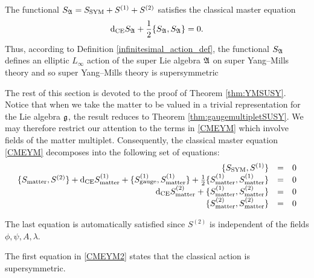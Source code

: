 \documentclass[10pt, oneside]{article}
\begin{document}
\begin{theorem}
The functional $S_{\mathfrak A} = S_{\rm SYM} + S^{(1)} + S^{(2)}$ satisfies the classical master equation
\begin{equation}
\label{CMEYM}
{\rm d}_{\mathrm{CE}} S_\mathfrak A + \frac{1}{2} \{S_\mathfrak A, S_\mathfrak A\} = 0 .
\end{equation}
Thus, according to Definition \ref{infinitesimal_action_def}, the functional $S_{\mathfrak A}$ defines an elliptic $L_\infty$ action of the super Lie algebra $\mathfrak A$ on super Yang--Mills theory and so super Yang--Mills theory is supersymmetric
\label{thm:YMSUSY}
\end{theorem}

The rest of this section is devoted to the proof of Theorem \ref{thm:YMSUSY}. 
Notice that when we take the matter to be valued in a trivial representation for the Lie algebra $\mathfrak g$, the result reduces to Theorem \ref{thm:gaugemultipletSUSY}.
We may therefore restrict our attention to the terms in \eqref{CMEYM} which involve fields of the matter multiplet. 
Consequently, the classical master equation \eqref{CMEYM} decomposes into the following set of equations:
\begin{equation}
\label{CMEYM2}
\begin{array}{rrrrrr}
\{S_{\rm SYM} , S^{(1)}\} & = & 0 \\ 
\{S_{\mathrm{matter}}, S^{(2)}\} + {\rm d}_{\mathrm{CE}} S_{\mathrm{matter}}^{(1)} + \{S_{\mathrm{gauge}}^{(1)}, S_{\mathrm{matter}}^{(1)}\} + \frac{1}{2} \{S_{\mathrm{matter}}^{(1)}, S_{\mathrm{matter}}^{(1)}\} & = & 0 \\
{\rm d}_{\mathrm{CE}} S_{\mathrm{matter}}^{(2)} + \{S_{\mathrm{matter}}^{(1)}, S_{\mathrm{matter}}^{(2)}\} & =& 0 \\
\{S_{\mathrm{matter}}^{(2)}, S_{\mathrm{matter}}^{(2)}\} & =& 0
\end{array}
\end{equation}

The last equation is automatically satisfied since $S^{(2)}$ is independent of the fields $\phi, \psi, A, \lambda$.

The first equation in \eqref{CMEYM2} states that the classical action is supersymmetric.
\end{document}
